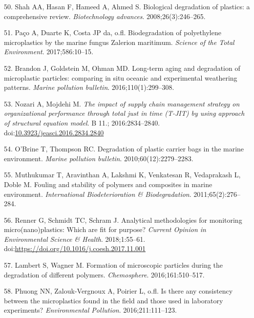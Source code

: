 \documentclass[icelandic,]{book}
\begin{document}
\leavevmode\hypertarget{ref-shah2008biological}{}%
50. Shah AA, Hasan F, Hameed A, Ahmed S. Biological degradation of plastics: a comprehensive review. \emph{Biotechnology advances}. 2008;26(3):246--265.

\leavevmode\hypertarget{ref-pacco2017biodegradation}{}%
51. Paço A, Duarte K, Costa JP da, o.fl. Biodegradation of polyethylene microplastics by the marine fungus Zalerion maritimum. \emph{Science of the Total Environment}. 2017;586:10--15.

\leavevmode\hypertarget{ref-brandon2016long}{}%
52. Brandon J, Goldstein M, Ohman MD. Long-term aging and degradation of microplastic particles: comparing in situ oceanic and experimental weathering patterns. \emph{Marine pollution bulletin}. 2016;110(1):299--308.

\leavevmode\hypertarget{ref-Nozari2016}{}%
53. Nozari A, Mojdehi M. \emph{The impact of supply chain management strategy on organizational performance through total just in time (T-JIT) by using approach of structural equation model}. B 11.; 2016:2834--2840. doi:\href{https://doi.org/10.3923/jeasci.2016.2834.2840}{10.3923/jeasci.2016.2834.2840}

\leavevmode\hypertarget{ref-o2010degradation}{}%
54. O'Brine T, Thompson RC. Degradation of plastic carrier bags in the marine environment. \emph{Marine pollution bulletin}. 2010;60(12):2279--2283.

\leavevmode\hypertarget{ref-muthukumar2011fouling}{}%
55. Muthukumar T, Aravinthan A, Lakshmi K, Venkatesan R, Vedaprakash L, Doble M. Fouling and stability of polymers and composites in marine environment. \emph{International Biodeterioration \& Biodegradation}. 2011;65(2):276--284.

\leavevmode\hypertarget{ref-RENNER201855}{}%
56. Renner G, Schmidt TC, Schram J. Analytical methodologies for monitoring micro(nano)plastics: Which are fit for purpose? \emph{Current Opinion in Environmental Science \& Health}. 2018;1:55--61. doi:\href{https://doi.org/https://doi.org/10.1016/j.coesh.2017.11.001}{https://doi.org/10.1016/j.coesh.2017.11.001}

\leavevmode\hypertarget{ref-lambert2016formation}{}%
57. Lambert S, Wagner M. Formation of microscopic particles during the degradation of different polymers. \emph{Chemosphere}. 2016;161:510--517.

\leavevmode\hypertarget{ref-phuong2016there}{}%
58. Phuong NN, Zalouk-Vergnoux A, Poirier L, o.fl. Is there any consistency between the microplastics found in the field and those used in laboratory experiments? \emph{Environmental Pollution}. 2016;211:111--123.
\end{document}
